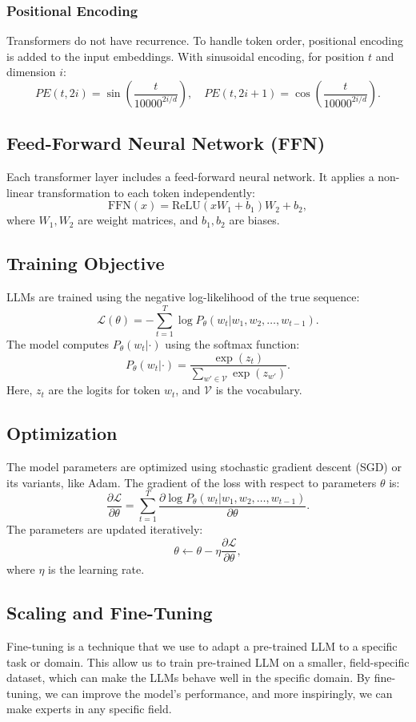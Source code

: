 \documentclass[fleqn,10pt]{SelfArx} %
\begin{document}
\subsubsection{Positional Encoding}

Transformers do not have recurrence. To handle token order, positional encoding is added to the input embeddings. With sinusoidal encoding, for position $t$ and dimension $i$:
\[
PE(t, 2i) = \sin\left(\frac{t}{10000^{2i/d}}\right), \quad PE(t, 2i+1) = \cos\left(\frac{t}{10000^{2i/d}}\right).
\]

\subsection{Feed-Forward Neural Network (FFN)}

Each transformer layer includes a feed-forward neural network. It applies a non-linear transformation to each token independently:
\[
\text{FFN}(x) = \text{ReLU}(xW_1 + b_1)W_2 + b_2,
\]
where $W_1, W_2$ are weight matrices, and $b_1, b_2$ are biases.

\subsection{Training Objective}

LLMs are trained using the negative log-likelihood of the true sequence:
\[
\mathcal{L}(\theta) = -\sum_{t=1}^T \log P_\theta(w_t | w_1, w_2, \ldots, w_{t-1}).
\]
The model computes $P_\theta(w_t | \cdot)$ using the softmax function:
\[
P_\theta(w_t | \cdot) = \frac{\exp(z_t)}{\sum_{w' \in \mathcal{V}} \exp(z_{w'})}.
\]
Here, $z_t$ are the logits for token $w_t$, and $\mathcal{V}$ is the vocabulary.

\subsection{Optimization}

The model parameters are optimized using stochastic gradient descent (SGD) or its variants, like Adam. The gradient of the loss with respect to parameters $\theta$ is:
\[
\frac{\partial \mathcal{L}}{\partial \theta} = \sum_{t=1}^T \frac{\partial \log P_\theta(w_t | w_1, w_2, \ldots, w_{t-1})}{\partial \theta}.
\]
The parameters are updated iteratively:
\[
\theta \leftarrow \theta - \eta \frac{\partial \mathcal{L}}{\partial \theta},
\]
where $\eta$ is the learning rate.

\subsection{Scaling and Fine-Tuning}
Fine-tuning is a technique that we use to adapt a pre-trained LLM to a specific task or domain. This allow us to train pre-trained LLM on a smaller, field-specific dataset, which can make the LLMs behave well in the specific domain. By fine-tuning, we can improve the model's performance, and more inspiringly, we can make experts in any specific field.
\end{document}
